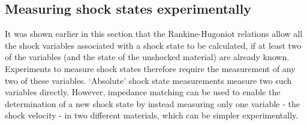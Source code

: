 \subsection{Measuring shock states experimentally}





It was shown earlier in this section that the Rankine-Hugoniot relations allow all the shock variables associated with a shock state to be calculated, if at least two of the variables (and the state of the unshocked material) are already known. Experiments to measure shock states therefore require the measurement of any two of these variables. `Absolute' shock state measurements measure two such variables directly. However, impedance matching can be used to enable the determination of a new shock state by instead measuring only one variable - the shock velocity - in two different materials, which can be simpler experimentally.


